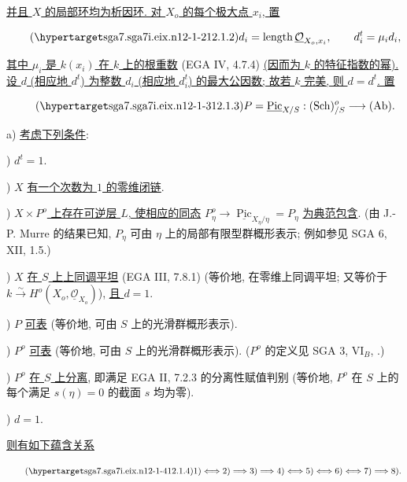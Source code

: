 \noindent
\underline{并且 $X$ 的局部环均为析因环. 对 $X_o$ 的每个极大点 $x_i$, 置}

\begin{equation}\tag{\SGARefTarget{sga7.sga7i.eix.n12-1-2}{12.1.2}}
 d_i=\operatorname{length}\underline{\mathcal O}_{X_o,x_i},
 \qquad d_i^t=\mu_i d_i,
\end{equation}

\noindent
\underline{其中 $\mu_i$ 是 $k(x_i)$ 在 $k$ 上的根重数} (EGA IV, 4.7.4) \underline{(因而为 $k$ 的特征指数的幂). 设 $d$ (相应地 $d^t$) 为整数 $d_i$ (相应地 $d_i^t$) 的最大公因数; 故若 $k$ 完美, 则 $d=d^t$. 置}

\begin{equation}\tag{\SGARefTarget{sga7.sga7i.eix.n12-1-3}{12.1.3}}
 P=\underline{\operatorname{Pic}}_{X/S}:
   (\operatorname{Sch})_{/S}^{o}\longrightarrow(\operatorname{Ab}).
\end{equation}

\noindent
a) \underline{考虑下列条件}:

\smallskip
{}) $d^t=1$.

\smallskip
{}) $X$ \underline{有一个次数为 $1$ 的零维闭链}.

\smallskip
{}) \underline{$X\times P^o$ 上存在可逆层 $L$, 使相应的同态}
$P^o_\eta\to\underline{\operatorname{Pic}}_{X_\eta/\eta}=P_\eta$
\underline{为典范包含}. (由 J.-P. Murre 的结果已知, $P_\eta$ 可由 $\eta$ 上的局部有限型群概形表示; 例如参见 SGA 6, XII, 1.5.)

\smallskip
{}) $X$ \underline{在 $S$ 上上同调平坦} (EGA III, 7.8.1) (等价地, 在零维上同调平坦; 又等价于 $k\xrightarrow{\sim}H^o(X_o,\underline{\mathcal O}_{X_o})$), \underline{且 $d=1$}.

\smallskip
{}) $P$ \underline{可表} (等价地, 可由 $S$ 上的光滑群概形表示).

\smallskip
{}) $P^o$ \underline{可表} (等价地, 可由 $S$ 上的光滑群概形表示). ($P^o$ 的定义见 SGA 3, $\mathrm{VI}_B$, .)

\smallskip
{}) $P^o$ \underline{在 $S$ 上分离}, 即满足 EGA II, 7.2.3 的分离性赋值判别 (等价地, $P^o$ 在 $S$ 上的每个满足 $s(\eta)=0$ 的截面 $s$ 均为零).

\smallskip
{}) $d=1$.

\smallskip
\noindent
\underline{则有如下蕴含关系}

\begin{equation}\tag{\SGARefTarget{sga7.sga7i.eix.n12-1-4}{12.1.4}}
 1)\Longleftrightarrow2)\Longrightarrow3)\Longrightarrow4)
 \Longleftrightarrow5)\Longleftrightarrow6)\Longleftrightarrow7)
 \Longrightarrow8).
\end{equation}


